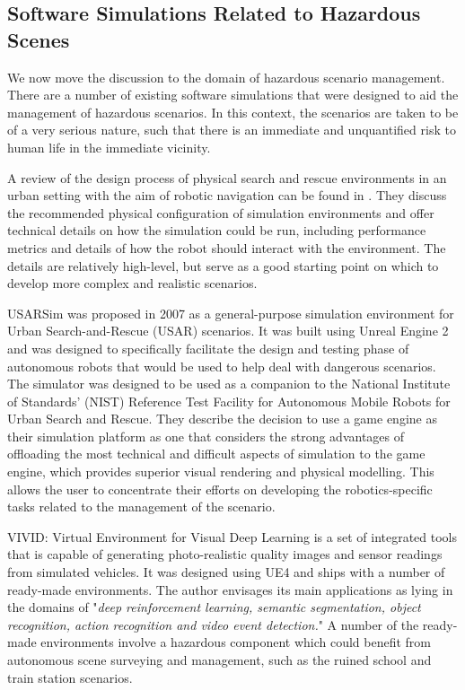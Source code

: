 \subsection{Software Simulations Related to Hazardous Scenes}
We now move the discussion to the domain of hazardous scenario management. There are a number of existing software simulations that were designed to aid the management of hazardous scenarios. In this context, the scenarios are taken to be of a very serious nature, such that there is an immediate and unquantified risk to human life in the immediate vicinity.

\par A review of the design process of physical search and rescue environments in an urban setting with the aim of robotic navigation can be found in \cite{Jacoff2003TestRobots}. They discuss the recommended physical configuration of simulation environments and offer technical details on how the simulation could be run, including performance metrics and details of how the robot should interact with the environment. The details are relatively high-level, but serve as a good starting point on which to develop more complex and realistic scenarios.

USARSim \cite{Carpin2007USARSim:Education} was proposed in 2007 as a general-purpose simulation environment for Urban Search-and-Rescue (USAR) scenarios. It was built using Unreal Engine 2 and was designed to specifically facilitate the design and testing phase of autonomous robots that would be used to help deal with dangerous scenarios. The simulator was designed to be used as a companion to the National Institute of Standards’ (NIST) Reference Test Facility for Autonomous Mobile Robots for Urban Search and Rescue. They describe the decision to use a game engine as their simulation platform as one that considers the strong advantages of offloading the most technical and difficult aspects of simulation to the game engine, which provides superior visual rendering and physical modelling. This allows the user to concentrate their efforts on developing the robotics-specific tasks related to the management of the scenario.\par


VIVID: Virtual Environment for Visual Deep Learning \cite{Lai2018ViviD:Learning} is a set of integrated tools that is capable of generating photo-realistic quality images and sensor readings from simulated vehicles. It was designed using UE4 and ships with a number of ready-made environments. The author envisages its main applications as lying in the domains of "\textit{deep reinforcement learning, semantic segmentation, object recognition, action recognition and video event detection.}" A number of the ready-made environments involve a hazardous component which could benefit from autonomous scene surveying and management, such as the ruined school and train station scenarios.



